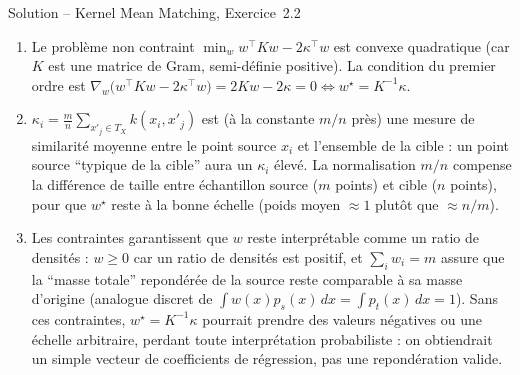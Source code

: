 \documentclass[11pt]{article}
\begin{document}
\begin{exercisebox}{Solution -- Kernel Mean Matching, Exercice~2.2}
\begin{enumerate}[label=(\alph*)]
\item Le problème non contraint $\min_w w^\top K w - 2\kappa^\top w$ est convexe quadratique (car $K$
est une matrice de Gram, semi-définie positive). La condition du premier ordre est
$\nabla_w\big(w^\top K w - 2\kappa^\top w\big) = 2Kw - 2\kappa = 0 \iff w^\star = K^{-1}\kappa$.
\item $\kappa_i = \frac{m}{n}\sum_{x'_j\in T_X} k(x_i,x'_j)$ est (à la constante $m/n$ près) une mesure
de similarité moyenne entre le point source $x_i$ et l'ensemble de la cible : un point source
\enquote{typique de la cible} aura un $\kappa_i$ élevé. La normalisation $m/n$ compense la différence de
taille entre échantillon source ($m$ points) et cible ($n$ points), pour que $w^\star$ reste à la bonne
échelle (poids moyen $\approx 1$ plutôt que $\approx n/m$).
\item Les contraintes garantissent que $w$ reste interprétable comme un ratio de densités : $w\ge 0$ car
un ratio de densités est positif, et $\sum_i w_i = m$ assure que la \enquote{masse totale} repondérée de
la source reste comparable à sa masse d'origine (analogue discret de $\int w(x)p_s(x)\,dx = \int
p_t(x)\,dx = 1$). Sans ces contraintes, $w^\star=K^{-1}\kappa$ pourrait prendre des valeurs négatives ou
une échelle arbitraire, perdant toute interprétation probabiliste : on obtiendrait un simple vecteur de
coefficients de régression, pas une repondération valide.
\end{enumerate}
\end{exercisebox}
\end{document}
